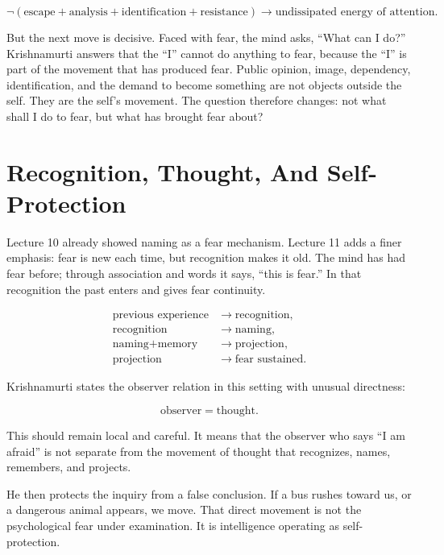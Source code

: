 \documentclass[11pt,oneside]{book}
\begin{document}
\begin{equation}
\neg(\text{escape}+\text{analysis}+\text{identification}+\text{resistance})
\longrightarrow
\text{undissipated energy of attention}.
\end{equation}

But the next move is decisive. Faced with fear, the mind asks, ``What can I do?'' Krishnamurti answers that the ``I'' cannot do anything to fear, because the ``I'' is part of the movement that has produced fear. Public opinion, image, dependency, identification, and the demand to become something are not objects outside the self. They are the self's movement. The question therefore changes: not what shall I do to fear, but what has brought fear about?

\section{Recognition, Thought, And Self-Protection}

Lecture 10 already showed naming as a fear mechanism. Lecture 11 adds a finer emphasis: fear is new each time, but recognition makes it old. The mind has had fear before; through association and words it says, ``this is fear.'' In that recognition the past enters and gives fear continuity.

\begin{align}
\text{previous experience} &\longrightarrow \text{recognition},\\
\text{recognition} &\longrightarrow \text{naming},\\
\text{naming}+\text{memory} &\longrightarrow \text{projection},\\
\text{projection} &\longrightarrow \text{fear sustained}.
\end{align}

Krishnamurti states the observer relation in this setting with unusual directness:

\begin{equation}
\text{observer} = \text{thought}.
\end{equation}

This should remain local and careful. It means that the observer who says ``I am afraid'' is not separate from the movement of thought that recognizes, names, remembers, and projects.

He then protects the inquiry from a false conclusion. If a bus rushes toward us, or a dangerous animal appears, we move. That direct movement is not the psychological fear under examination. It is intelligence operating as self-protection.
\end{document}
